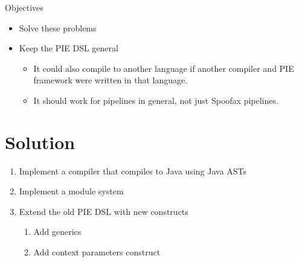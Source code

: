 Objectives
\begin{itemize}
  \item Solve these problems
  \item Keep the PIE DSL general
  \begin{itemize}
    \item It could also compile to another language if another compiler and PIE framework were written in that language.
    \item It should work for pipelines in general, not just Spoofax pipelines.
  \end{itemize}
\end{itemize}

\section{\label{sec:introduction__solution}Solution}
\begin{enumerate}
  \item Implement a compiler that compiles to Java using Java ASTs
  \item Implement a module system
  \item Extend the old PIE DSL with new constructs
  \begin{enumerate}
    \item Add generics
    \item Add context parameters construct
  \end{enumerate}
\end{enumerate}
